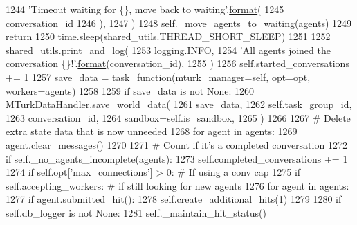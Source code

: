\begin{DoxyCode}
1244                         \textcolor{stringliteral}{'Timeout waiting for \{\}, move back to waiting'}.\hyperlink{namespaceparlai_1_1chat__service_1_1services_1_1messenger_1_1shared__utils_a32e2e2022b824fbaf80c747160b52a76}{format}(
1245                             conversation\_id
1246                         ),
1247                     )
1248                     self.\_move\_agents\_to\_waiting(agents)
1249                     \textcolor{keywordflow}{return}
1250                 time.sleep(shared\_utils.THREAD\_SHORT\_SLEEP)
1251 
1252             shared\_utils.print\_and\_log(
1253                 logging.INFO,
1254                 \textcolor{stringliteral}{'All agents joined the conversation \{\}!'}.\hyperlink{namespaceparlai_1_1chat__service_1_1services_1_1messenger_1_1shared__utils_a32e2e2022b824fbaf80c747160b52a76}{format}(conversation\_id),
1255             )
1256             self.started\_conversations += 1
1257             save\_data = task\_function(mturk\_manager=self, opt=opt, workers=agents)
1258 
1259             \textcolor{keywordflow}{if} save\_data \textcolor{keywordflow}{is} \textcolor{keywordflow}{not} \textcolor{keywordtype}{None}:
1260                 MTurkDataHandler.save\_world\_data(
1261                     save\_data,
1262                     self.task\_group\_id,
1263                     conversation\_id,
1264                     sandbox=self.is\_sandbox,
1265                 )
1266 
1267             \textcolor{comment}{# Delete extra state data that is now unneeded}
1268             \textcolor{keywordflow}{for} agent \textcolor{keywordflow}{in} agents:
1269                 agent.clear\_messages()
1270 
1271             \textcolor{comment}{# Count if it's a completed conversation}
1272             \textcolor{keywordflow}{if} self.\_no\_agents\_incomplete(agents):
1273                 self.completed\_conversations += 1
1274             \textcolor{keywordflow}{if} self.opt[\textcolor{stringliteral}{'max\_connections'}] > 0:  \textcolor{comment}{# If using a conv cap}
1275                 \textcolor{keywordflow}{if} self.accepting\_workers:  \textcolor{comment}{# if still looking for new agents}
1276                     \textcolor{keywordflow}{for} agent \textcolor{keywordflow}{in} agents:
1277                         \textcolor{keywordflow}{if} agent.submitted\_hit():
1278                             self.create\_additional\_hits(1)
1279 
1280         \textcolor{keywordflow}{if} self.db\_logger \textcolor{keywordflow}{is} \textcolor{keywordflow}{not} \textcolor{keywordtype}{None}:
1281             self.\_maintain\_hit\_status()

\end{DoxyCode}
